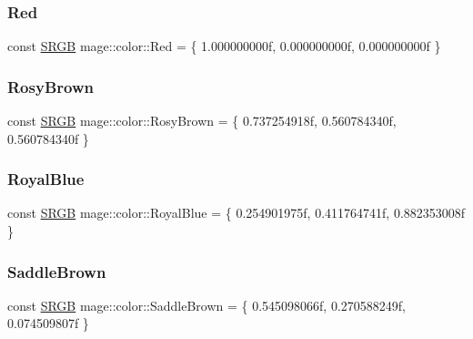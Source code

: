 \hypertarget{namespacemage_1_1color_a6d620e83b3d57b75b633845e75c11fb3}{}\label{namespacemage_1_1color_a6d620e83b3d57b75b633845e75c11fb3} 
\subsubsection{\texorpdfstring{Red}{Red}}
{\footnotesize\ttfamily const \hyperlink{structmage_1_1_s_r_g_b}{S\+R\+GB} mage\+::color\+::\+Red = \{ 1.\+000000000f, 0.\+000000000f, 0.\+000000000f \}}

\hypertarget{namespacemage_1_1color_a9cf3275aa615478cbfb64eff8f7e8031}{}\label{namespacemage_1_1color_a9cf3275aa615478cbfb64eff8f7e8031} 
\subsubsection{\texorpdfstring{Rosy\+Brown}{RosyBrown}}
{\footnotesize\ttfamily const \hyperlink{structmage_1_1_s_r_g_b}{S\+R\+GB} mage\+::color\+::\+Rosy\+Brown = \{ 0.\+737254918f, 0.\+560784340f, 0.\+560784340f \}}

\hypertarget{namespacemage_1_1color_a39f986452e5943dc0b5f2f10ba19fefd}{}\label{namespacemage_1_1color_a39f986452e5943dc0b5f2f10ba19fefd} 
\subsubsection{\texorpdfstring{Royal\+Blue}{RoyalBlue}}
{\footnotesize\ttfamily const \hyperlink{structmage_1_1_s_r_g_b}{S\+R\+GB} mage\+::color\+::\+Royal\+Blue = \{ 0.\+254901975f, 0.\+411764741f, 0.\+882353008f \}}

\hypertarget{namespacemage_1_1color_afbd77630ec00531bca18265530964fbd}{}\label{namespacemage_1_1color_afbd77630ec00531bca18265530964fbd} 
\subsubsection{\texorpdfstring{Saddle\+Brown}{SaddleBrown}}
{\footnotesize\ttfamily const \hyperlink{structmage_1_1_s_r_g_b}{S\+R\+GB} mage\+::color\+::\+Saddle\+Brown = \{ 0.\+545098066f, 0.\+270588249f, 0.\+074509807f \}}

